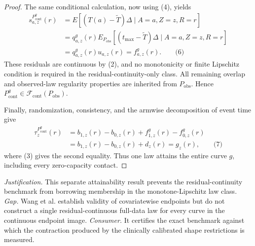 \documentclass{article}
\begin{document}
\begin{proof}
The same conditional calculation, now using (4), yields
\[
\begin{aligned}
s^{P^g_{\mathrm{cont}}}_{a,z}(r)
&=E[(T(a)-\widetilde T)\Delta\mid A=a,Z=z,R=r]\\
&=q^g_{a,z}(r)
E_{P_{\mathrm{obs}}}[(t_{\max}-\widetilde T)\Delta
 \mid A=a,Z=z,R=r]\\
&=q^g_{a,z}(r)u_{a,z}(r)
=f^g_{a,z}(r).                                                         \qquad\text{(6)}
\end{aligned}
\]
These residuals are continuous by (2), and no monotonicity or finite Lipschitz condition is required in the residual-continuity-only class.  All remaining overlap and observed-law regularity properties are inherited from \(P_{\mathrm{obs}}\).  Hence \(P^g_{\mathrm{cont}}\in\mathcal F_{\mathrm{cont}}(P_{\mathrm{obs}})\).

Finally, randomization, consistency, and the armwise decomposition of event time give
\[
\begin{aligned}
\tau_z^{P^g_{\mathrm{cont}}}(r)
&=b_{1,z}(r)-b_{0,z}(r)
 +f^g_{1,z}(r)-f^g_{0,z}(r)\\
&=b_{1,z}(r)-b_{0,z}(r)+d_z(r)
=g_z(r),                                                               \qquad\text{(7)}
\end{aligned}
\]
where (3) gives the second equality.  Thus one law attains the entire curve \(g\), including every zero-capacity contact.
\end{proof}
\par\smallskip\noindent \textit{Justification.} This separate attainability result prevents the residual-continuity benchmark from borrowing membership in the monotone-Lipschitz law class. \textit{Gap.} Wang et al. establish validity of covariatewise endpoints but do not construct a single residual-continuous full-data law for every curve in the continuous endpoint image. \textit{Consumer.} It certifies the exact benchmark against which the contraction produced by the clinically calibrated shape restrictions is measured.
\end{document}
